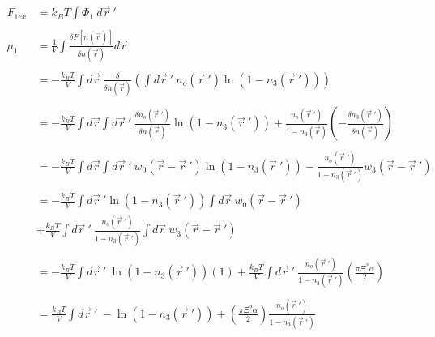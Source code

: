 \documentclass[double,12pt]{revtex4-2}
\begin{document}
\begin{align}
    F_{1ex} &= k_BT\int \Phi_1~d\vec r~' \\ \nonumber\\
    \mu_1 &= \frac{1}{V}\int \frac{\delta F[n(\vec r)]}{\delta n(\vec r)} d\vec r \\ \nonumber\\
%
        &= -\frac{k_BT}{V} \int d\vec r ~\frac{\delta}
        {\delta n(\vec r)}\left(\int d\vec r~'~n_o(\vec r~')\ln(1-n_3(\vec r~'))\right) \\ \nonumber\\
%
        &= -\frac{k_BT}{V}\int d\vec r\int d\vec r~'~\frac{\delta n_o(\vec r~')}
        {\delta n(\vec r)}\ln(1-n_3(\vec r~'))+\frac{n_o(\vec r~')}
          {1-n_3(\vec r)}\left(-\frac{\delta n_3(\vec r~')}{\delta n(\vec r)}
          \right) \\ \nonumber\\
%
        &= -\frac{k_BT}{V} \int d\vec r \int d\vec r~' ~w_0(\vec r - \vec r~')
          \ln(1-n_3(\vec r~')) - \frac{n_o(\vec r~')}
          {1-n_3(\vec r~')}w_3(\vec r - \vec r~') \\ \nonumber\\
%
        &= -\frac{k_BT}{V} \int d\vec r~'\ln(1-n_3(\vec r~')) \int d \vec r  
          ~w_0(\vec r - \vec r~') \nonumber\\
        &+ \frac{k_BT}{V} \int d\vec r~' ~\frac{n_o(\vec r~')}{1-n_3(\vec r~')} 
          \int d \vec r~w_3(\vec r - \vec r~')  \\ \\
%
        &= -\frac{k_BT}{V} \int d\vec r~' ~\ln(1-n_3(\vec r~'))(1)
          + \frac{k_BT}{V} \int d\vec r~' ~\frac{n_o(\vec r~')}{1-n_3(\vec r~')}
          \left(\frac{\pi\Xi^2\alpha}{2}\right) \\ \\
%
        &= \frac{k_BT}{V}\int d\vec r~'~ -\ln(1-n_3(\vec r~'))+\left(
        \frac{\pi\Xi^2\alpha}{2}\right)\frac{n_o(\vec r~')}{1-n_3(\vec r~')}
\end{align}
\end{document}
